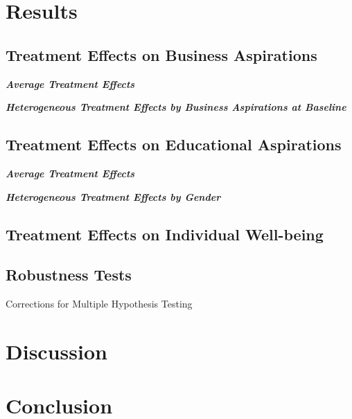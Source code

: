 \documentclass[11.5pt]{article}
\begin{document}
\section{Results}

\subsection{Treatment Effects on Business Aspirations}

\noindent \emph{\textbf{Average Treatment Effects}}

\noindent \emph{\textbf{Heterogeneous Treatment Effects by Business Aspirations at Baseline}}

\subsection{Treatment Effects on Educational Aspirations}

\noindent \emph{\textbf{Average Treatment Effects}}

\noindent \emph{\textbf{Heterogeneous Treatment Effects by Gender}}

\subsection{Treatment Effects on Individual Well-being}

\subsection{Robustness Tests}

Corrections for Multiple Hypothesis Testing

\section{Discussion}

\section{Conclusion}




\pagebreak




\clearpage
\end{document}
